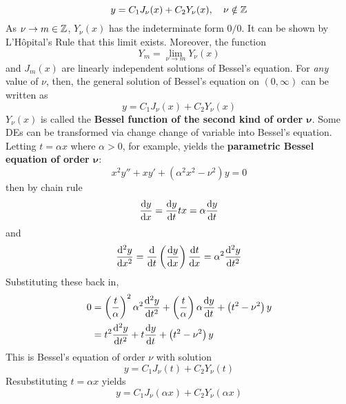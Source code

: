 \documentclass[./Differential Equations.tex]{subfiles}
\begin{document}
				\[y = C_1J_\nu(x) + C_2Y_\nu(x), \quad \nu \notin \mathbb{Z}\]
				As \(\nu \to m \in \mathbb{Z}\), \(Y_\nu(x)\) has the indeterminate form \(0/0\). It can be shown by L'H\^opital's Rule that this limit exists. Moreover, the function
				\[Y_m = \lim_{\nu \to m}Y_\nu(x)\]
				and \(J_m(x)\) are linearly independent solutions of Bessel's equation. For \textit{any} value of \(\nu\), then, the general solution of Bessel's equation on \((0, \infty)\) can be written as
				\[y = C_1J_\nu(x) + C_2Y_\nu(x)\]
				\(Y_\nu(x)\) is called the \textbf{Bessel function of the second kind of order \(\bm{\nu}\)}.
			Some DEs can be transformed via change change of variable into Bessel's equation. Letting \(t = \alpha x\) where \(\alpha > 0\), for example, yields the \textbf{parametric Bessel equation of order \(\bm{\nu}\)}:
				\[x^2y'' + xy' + \left(\alpha^2x^2 - \nu^2\right)y = 0\]
				then by chain rule
				\[
					\dv{y}{x} = \dv{y}{t}{t}{x} 
						= \alpha\dv{y}{t}
				\]
				and
				\[
					\dv[2]{y}{x} = \dv{t}\left(\dv{y}{x}\right)\dv{t}{x} 
						= \alpha^2\dv[2]{y}{t}
				\]
				Substituting these back in,
				\begin{align*}
					0 &= \left(\frac{t}{\alpha}\right)^2\alpha^2\dv[2]{y}{t} + \left(\frac{t}{\alpha}\right)\alpha\dv{y}{t} + \left(t^2 - \nu^2\right)y \\
						&= t^2\dv[2]{y}{t} + t\dv{y}{t} + \left(t^2 - \nu^2\right)y
				\end{align*}
				This is Bessel's equation of order \(\nu\) with solution
				\[y = C_1J_\nu(t) + C_2Y_\nu(t)\]
				Resubstituting \(t = \alpha x\) yields
				\[y = C_1J_\nu(\alpha x) + C_2Y_\nu(\alpha x)\]
\end{document}
